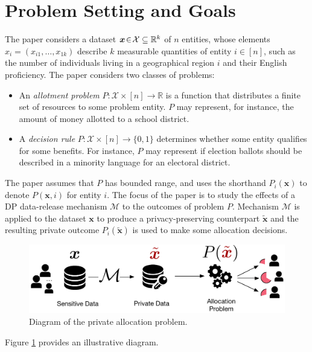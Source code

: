 \documentclass[9pt,twocolumn,twoside,lineno]{pnas-new}
\newcommand{\cM}{\mathcal{M}}
\newcommand{\cX}{\mathcal{X}}
\begin{document}
\section*{Problem Setting and Goals}
\label{sec:setting}


The paper considers a dataset $\bm{x} \!\in\! \cX \subseteq \RR^k$ of $n$ entities, 
whose elements $x_i= (x_{i1},\ldots, x_{1k})$ describe $k$ measurable 
quantities of entity $i \!\in\! [n]$, such as the number of individuals living 
in a geographical region $i$ and their English proficiency. 
The paper considers two classes of problems: 
\begin{itemize}[leftmargin=*,labelsep=2pt,itemsep=0pt,parsep=2pt,topsep=2pt]
\item An \emph{allotment problem} $P : \cX \times [n] \to \mathbb{R}$ is a function that distributes a finite set of resources to some problem entity. $P$ may represent, for instance, the amount of money allotted to a school district. 
\item A \emph{decision rule} $P: \cX \times [n] \to \{0,1\}$
  determines whether some entity qualifies for some benefits.  For
  instance, $P$ may represent if election ballots should be described
  in a minority language for an electoral district.
\end{itemize}
The paper assumes that $P$ has bounded range, and uses the shorthand
$P_i(\bm{x})$ to denote $P(\bm{x}, i)$ for entity $i$.
%
The focus of the paper is to study the effects of a DP data-release
mechanism $\cM$ to the outcomes of problem $P$. Mechanism $\cM$ is
applied to the dataset $\bm{x}$ to produce a privacy-preserving
counterpart $\tilde{\bm{x}}$ and the resulting private outcome
$P_i(\tilde{\bm{x}})$ is used to make some allocation decisions.

\begin{figure}[!t] 
\centering
\includegraphics[width=0.9\columnwidth]{images/figure.pdf}
\caption{Diagram of the private allocation problem.}
\label{fig:framework}
\end{figure}
Figure \ref{fig:framework} provides an illustrative diagram. 
\end{document}
